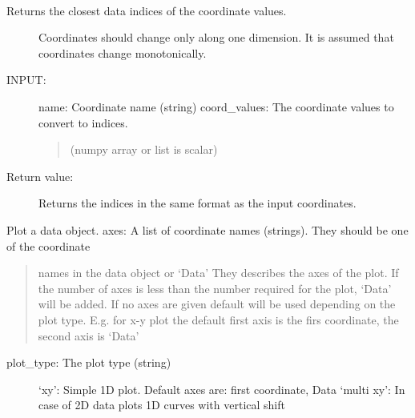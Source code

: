 \documentclass[letterpaper,10pt,english]{sphinxmanual}
\begin{document}
\begin{fulllineitems}
\begin{fulllineitems}
\end{fulllineitems}


\begin{fulllineitems}
\label{\detokenize{data_object:flap.data_object.DataObject.index_from_coordinate}}~\begin{description}
\item[{Returns the closest data indices of the coordinate values.}] \leavevmode
Coordinates should change only along one dimension.
It is assumed that coordinates change monotonically.

\item[{INPUT:}] \leavevmode
name: Coordinate name (string)
coord\_values: The coordinate values to convert to indices.
\begin{quote}

(numpy array or list is scalar)
\end{quote}

\item[{Return value:}] \leavevmode
Returns the indices in the same format as the input coordinates.

\end{description}

\end{fulllineitems}


\begin{fulllineitems}
\label{\detokenize{data_object:flap.data_object.DataObject.plot}}
Plot a data object.
axes: A list of coordinate names (strings). They should be one of the coordinate
\begin{quote}

names in the data object or ‘Data’
They describes the axes of the plot.
If the number of axes is less than the number required for the plot, ‘Data’ will be added.
If no axes are given default will be used depending on the plot type. E.g. for
x-y plot the default first axis is the firs coordinate, the second axis is ‘Data’
\end{quote}
\begin{description}
\item[{plot\_type: The plot type (string)}] \leavevmode
‘xy’: Simple 1D plot. Default axes are: first coordinate, Data
‘multi xy’: In case of 2D data plots 1D curves with vertical shift
\begin{quote}


\end{quote}
\end{description}
\end{fulllineitems}
\end{fulllineitems}
\end{document}
